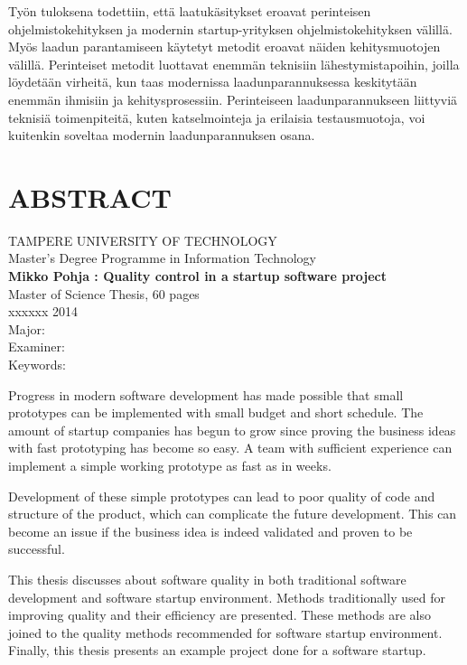 \noindent
Työn tuloksena todettiin, että laatukäsitykset eroavat perinteisen ohjelmistokehityksen ja modernin startup-yrityksen ohjelmistokehityksen välillä. Myös laadun parantamiseen käytetyt metodit eroavat näiden kehitysmuotojen välillä. Perinteiset metodit luottavat enemmän teknisiin lähestymistapoihin, joilla löydetään virheitä, kun taas modernissa laadunparannuksessa keskitytään enemmän ihmisiin ja kehitysprosessiin. Perinteiseen laadunparannukseen liittyviä teknisiä toimenpiteitä, kuten katselmointeja ja erilaisia testausmuotoja, voi kuitenkin soveltaa modernin laadunparannuksen osana. 

\newpage
\chapter*{ABSTRACT}
\begin{spacing}{1.0}
\textsf{TAMPERE UNIVERSITY OF TECHNOLOGY}\\
\textsf{Master's Degree Programme in Information Technology}\\
{\bf \textsf{Mikko Pohja : Quality control in a startup software project}}\\
\textsf{Master of Science Thesis, 60 pages}\\
\textsf{xxxxxx 2014}\\
\textsf{Major: }\\
\textsf{Examiner: }\\
\textsf{Keywords: }\\
\end{spacing}
 
\noindent
Progress in modern software development has made possible that small prototypes can be implemented with small budget and short schedule. The amount of startup companies has begun to grow since proving the business ideas with fast prototyping has become so easy. A team with sufficient experience can implement a simple working prototype as fast as in weeks.
 
\noindent
Development of these simple prototypes can lead to poor quality of code and structure of the product, which can complicate the future development. This can become an issue if the business idea is indeed validated and proven to be successful.

\noindent
This thesis discusses about software quality in both traditional software development and software startup environment. Methods traditionally used for improving quality and their efficiency are presented. These methods are also joined to the quality methods recommended for software startup environment. Finally, this thesis presents an example project done for a software startup.

